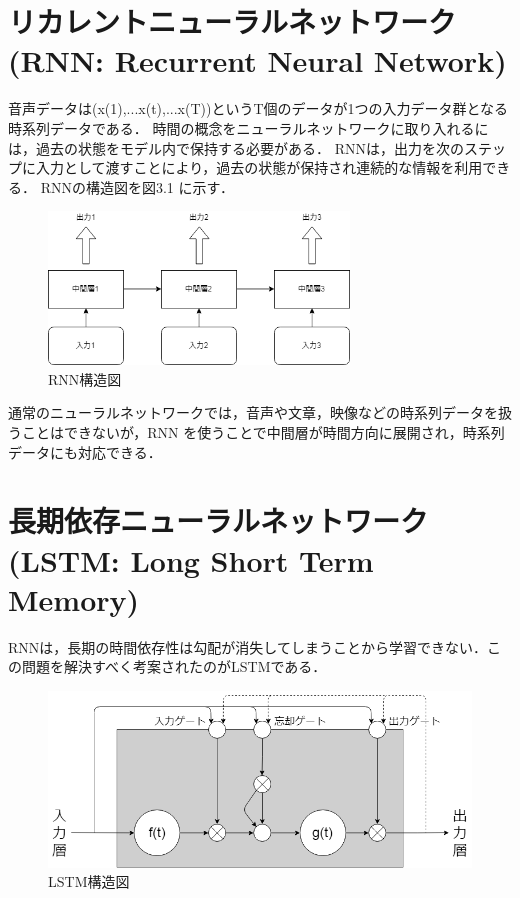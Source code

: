 \documentclass{jreport}		%
\begin{document}
\section{リカレントニューラルネットワーク(RNN: Recurrent Neural Network)}
音声データは(x(1),...x(t),...x(T))というT個のデータが1つの入力データ群となる時系列データである．
時間の概念をニューラルネットワークに取り入れるには，過去の状態をモデル内で保持する必要がある．
RNNは，出力を次のステップに入力として渡すことにより，過去の状態が保持され連続的な情報を利用できる．\cite{RNN}
RNNの構造図を図3.1 に示す．

\begin{figure}[htbp]
 \begin{center}
  \includegraphics[width=80mm]{RNN.png}
 \end{center}
 \caption{RNN構造図}
 \label{fig:one}
\end{figure}

通常のニューラルネットワークでは，音声や文章，映像などの時系列データを扱うことはできないが，RNN を使うことで中間層が時間方向に展開され，時系列データにも対応できる．

\section{長期依存ニューラルネットワーク(LSTM: Long Short Term Memory)}
RNNは，長期の時間依存性は勾配が消失してしまうことから学習できない．この問題を解決すべく考案されたのがLSTMである．
\newpage

\begin{figure}[htbp]
 \begin{center}
  \includegraphics[width=120mm]{LSTM.png}
 \end{center}
 \caption{LSTM構造図}
 \label{fig:one}
\end{figure}
\end{document}
